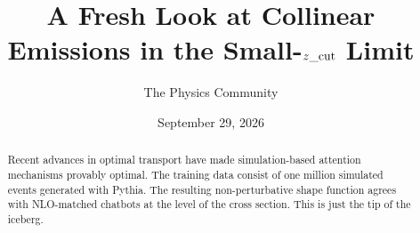 \documentclass[11pt]{article}
\title{A Fresh Look at Collinear Emissions in the Small-$z\_{\rm cut}$ Limit}
\author{The Physics Community}
\date{September 29, 2026}
\begin{document}
\maketitle
\begin{abstract}
Recent advances in optimal transport have made simulation-based
attention mechanisms provably optimal. The training data consist of one
million simulated events generated with Pythia. The resulting
non-perturbative shape function agrees with NLO-matched chatbots at the
level of the cross section. This is just the tip of the iceberg.
\end{abstract}
\tableofcontents






\nocite{*}


\end{document}
